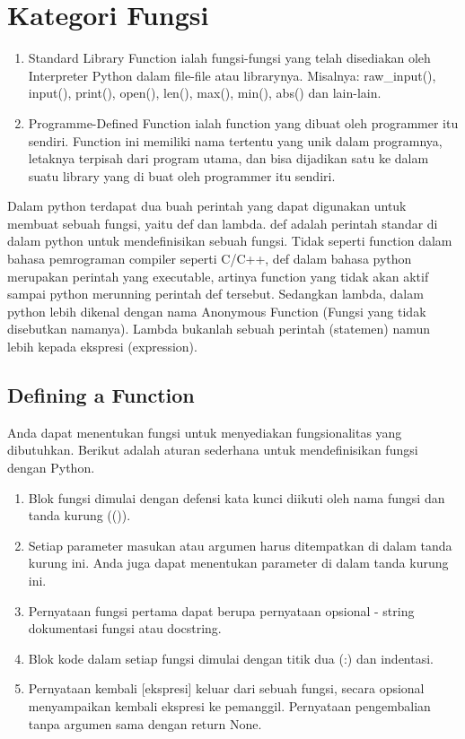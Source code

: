 \section{Kategori Fungsi}
\begin{enumerate}
\item Standard Library Function ialah fungsi-fungsi yang telah disediakan oleh Interpreter Python dalam file-file atau librarynya.  Misalnya: raw\_input(), input(), print(), open(), len(), max(), min(), abs()  dan lain-lain. 
\item Programme-Defined Function ialah function yang dibuat oleh programmer itu sendiri. Function ini memiliki nama tertentu yang unik dalam programnya, letaknya terpisah dari program utama, dan bisa dijadikan satu ke dalam suatu library yang di buat oleh programmer itu sendiri.
\end{enumerate}

Dalam python terdapat dua buah perintah yang dapat digunakan untuk membuat sebuah fungsi, yaitu def dan lambda. def adalah perintah standar di dalam python untuk mendefinisikan sebuah fungsi. Tidak seperti function dalam bahasa pemrograman compiler seperti C/C++, def dalam bahasa python merupakan perintah yang executable, artinya function yang tidak akan aktif sampai python merunning perintah def tersebut. Sedangkan lambda, dalam python lebih dikenal dengan nama Anonymous Function (Fungsi yang tidak disebutkan namanya). Lambda bukanlah sebuah perintah (statemen) namun lebih kepada ekspresi (expression).


\subsection{Defining a Function} 
Anda dapat menentukan fungsi untuk menyediakan fungsionalitas yang dibutuhkan. Berikut adalah aturan sederhana untuk mendefinisikan fungsi dengan Python. 
\begin{enumerate}
\item Blok fungsi dimulai dengan defensi kata kunci diikuti oleh nama fungsi dan tanda kurung (()).
\item Setiap parameter masukan atau argumen harus ditempatkan di dalam tanda kurung ini. Anda juga dapat menentukan parameter di dalam tanda kurung ini.
\item Pernyataan fungsi pertama dapat berupa pernyataan opsional - string dokumentasi fungsi atau docstring.
\item Blok kode dalam setiap fungsi dimulai dengan titik dua (:) dan indentasi.
\item Pernyataan kembali [ekspresi] keluar dari sebuah fungsi, secara opsional menyampaikan kembali ekspresi ke pemanggil. Pernyataan pengembalian tanpa argumen sama dengan return None.
\end{enumerate}

